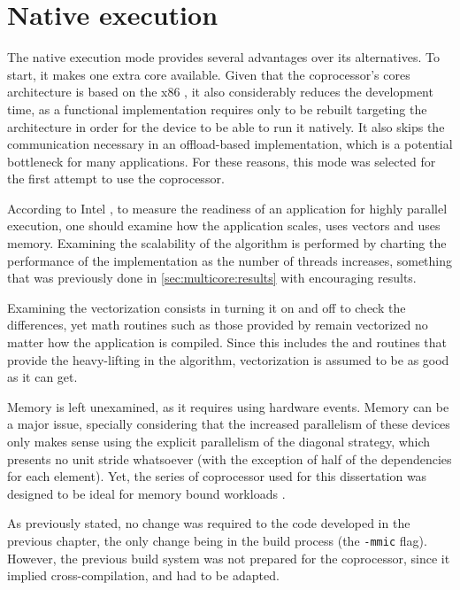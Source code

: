 \documentclass[../thesis]{subfiles}
\begin{document}
	\section{Native execution}
	\label{sec:mic:native}

	The native execution mode provides several advantages over its alternatives. To start, it makes one extra core available. Given that the coprocessor's cores architecture is based on the x86 \isa, it also considerably reduces the development time, as a \cpu functional implementation requires only to be rebuilt targeting the \mic architecture in order for the device to be able to run it natively. It also skips the communication necessary in an offload-based implementation, which is a potential bottleneck for many applications. For these reasons, this mode was selected for the first attempt to use the \intel\xeonphi coprocessor.

	According to Intel \cite{Intel:MIC:Overview}, to measure the readiness of an application for highly parallel execution, one should examine how the application scales, uses vectors and uses memory. Examining the scalability of the algorithm is performed by charting the performance of the implementation as the number of threads increases, something that was previously done in \cref{sec:multicore:results} with encouraging results.

	Examining the vectorization consists in turning it on and off to check the differences, yet math routines such as those provided by \intel\mkl remain vectorized no matter how the application is compiled. Since this includes the \blas and \lapack routines that provide the heavy-lifting in the algorithm, vectorization is assumed to be as good as it can get.

	Memory is left unexamined, as it requires using hardware events. Memory can be a major issue, specially considering that the increased parallelism of these devices only makes sense using the explicit parallelism of the diagonal strategy, which presents no unit stride whatsoever (with the exception of half of the dependencies for each element). Yet, the series of \intel\xeonphi coprocessor used for this dissertation was designed to be ideal for memory bound workloads \cite{Intel:MIC:Discovery}.

	As previously stated, no change was required to the code developed in the previous chapter, the only change being in the build process (the \texttt{-mmic} flag). However, the previous build system was not prepared for the \intel\xeonphi coprocessor, since it implied cross-compilation, and had to be adapted.

	
\end{document}
